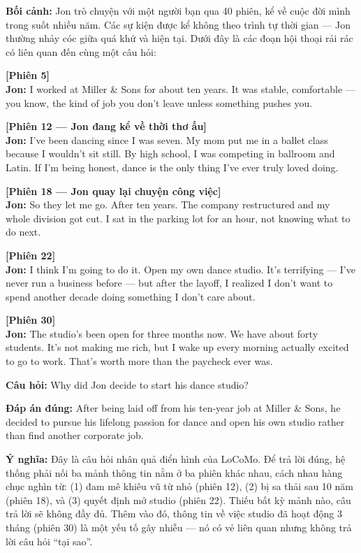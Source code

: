 \documentclass[../main.tex]{subfiles}
\begin{document}
\begin{tcolorbox}[colback=black!1,colframe=black!30,breakable,title={Ví dụ mẫu từ LoCoMo}]
\textbf{Bối cảnh:} Jon trò chuyện với một người bạn qua 40 phiên, kể về cuộc đời mình trong suốt nhiều năm. Các sự kiện được kể không theo trình tự thời gian — Jon thường nhảy cóc giữa quá khứ và hiện tại. Dưới đây là các đoạn hội thoại rải rác có liên quan đến cùng một câu hỏi:

\bigskip
\noindent\textbf{[Phiên 5]} \\
\textbf{Jon:} I worked at Miller \& Sons for about ten years. It was stable, comfortable — you know, the kind of job you don't leave unless something pushes you.

\bigskip
\noindent\textbf{[Phiên 12 — Jon đang kể về thời thơ ấu]} \\
\textbf{Jon:} I've been dancing since I was seven. My mom put me in a ballet class because I wouldn't sit still. By high school, I was competing in ballroom and Latin. If I'm being honest, dance is the only thing I've ever truly loved doing.

\bigskip
\noindent\textbf{[Phiên 18 — Jon quay lại chuyện công việc]} \\
\textbf{Jon:} So they let me go. After ten years. The company restructured and my whole division got cut. I sat in the parking lot for an hour, not knowing what to do next.

\bigskip
\noindent\textbf{[Phiên 22]} \\
\textbf{Jon:} I think I'm going to do it. Open my own dance studio. It's terrifying — I've never run a business before — but after the layoff, I realized I don't want to spend another decade doing something I don't care about.

\bigskip
\noindent\textbf{[Phiên 30]} \\
\textbf{Jon:} The studio's been open for three months now. We have about forty students. It's not making me rich, but I wake up every morning actually excited to go to work. That's worth more than the paycheck ever was.

\medskip
\noindent\textbf{Câu hỏi:} Why did Jon decide to start his dance studio?

\noindent\textbf{Đáp án đúng:} After being laid off from his ten-year job at Miller \& Sons, he decided to pursue his lifelong passion for dance and open his own studio rather than find another corporate job.

\noindent\textbf{Ý nghĩa:} Đây là câu hỏi nhân quả điển hình của LoCoMo. Để trả lời đúng, hệ thống phải nối ba mảnh thông tin nằm ở ba phiên khác nhau, cách nhau hàng chục nghìn từ: (1) đam mê khiêu vũ từ nhỏ (phiên 12), (2) bị sa thải sau 10 năm (phiên 18), và (3) quyết định mở studio (phiên 22). Thiếu bất kỳ mảnh nào, câu trả lời sẽ không đầy đủ. Thêm vào đó, thông tin về việc studio đã hoạt động 3 tháng (phiên 30) là một yếu tố gây nhiễu — nó có vẻ liên quan nhưng không trả lời câu hỏi ``tại sao''.
\end{tcolorbox}
\end{document}
